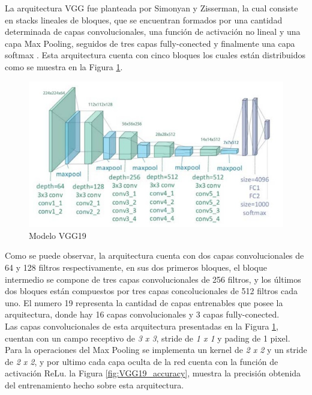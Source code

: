 				La arquitectura VGG fue planteada por Simonyan y Zisserman, la cual consiste en stacks lineales de bloques, que se encuentran formados por una cantidad determinada de capas convolucionales, una función de activación no lineal y una capa Max Pooling, seguidos de tres capas fully-conected y finalmente una capa softmax \cite{ref_2}. Esta arquitectura cuenta con cinco bloques los cuales están distribuidos como se muestra en la Figura \ref{fig:VGG19}.				
			
				\newpage
				\begin{figure}[ht]
					\centering
					\includegraphics[scale=0.38]{Figs/22.jpeg}
					\caption{Modelo VGG19}
					\label{fig:VGG19}
				\end{figure}			
				
				
				Como se puede observar, la arquitectura cuenta con dos capas convolucionales de 64 y 128 filtros respectivamente, en sus dos primeros bloques, el bloque intermedio se compone de tres capas convolucionales de 256 filtros, y los últimos dos bloques están compuestos por tres capas concolucionales de 512 filtros cada uno. El numero 19 representa la cantidad de capas entrenables que posee la arquitectura, donde hay 16 capas convolucionales y 3 capas fully-conected.\\			
					
				Las capas convolucionales de esta arquitectura presentadas en la Figura \ref{fig:VGG19}, cuentan con un campo receptivo de \textit{3 x 3}, stride de \textit{1 x 1} y pading de 1 pixel. Para la operaciones del Max Pooling se implementa un kernel de \textit{2 x 2} y un stride de \textit{2 x 2}, y por ultimo cada capa oculta de la red cuenta con la función de activación ReLu. la Figura \ref{fig:VGG19_accuracy}, muestra la precisión obtenida del entrenamiento hecho sobre esta arquitectura.
				
